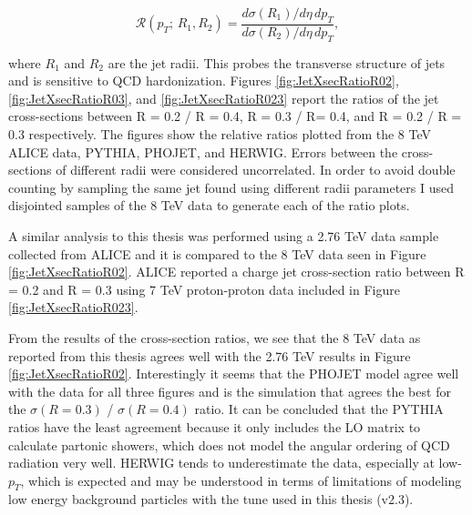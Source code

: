 \begin{equation}
\mathscr{R} (p_{T}; \, R_{1},R_{2}) = \frac{d\sigma(R_{1}) /d\eta \, dp_{T} }{d\sigma (R_{2}) /d\eta \, dp_{T}},
\label{eq:jetxsecratio}
\end{equation}

\noindent
where $R_{1}$ and $R_{2}$ are the jet radii. This probes the transverse structure of jets and is sensitive to QCD hardonization\cite{SOYEZ201159}.  Figures \ref{fig:JetXsecRatioR02}, \ref{fig:JetXsecRatioR03}, and \ref{fig:JetXsecRatioR023} report the ratios of the jet cross-sections between R = 0.2 / R = 0.4, R = 0.3 / R= 0.4, and R = 0.2 / R = 0.3 respectively.  The figures show the relative ratios plotted from the 8 TeV ALICE data, PYTHIA, PHOJET, and HERWIG.  Errors between the cross-sections of different radii were considered uncorrelated.  In order to avoid double counting by sampling the same jet found using different radii parameters I used disjointed samples of the 8 TeV data to generate each of the ratio plots.



A similar analysis to this thesis was performed using a 2.76 TeV  data sample collected from ALICE\cite{MA2013319} and it is compared to the 8 TeV data seen in Figure \ref{fig:JetXsecRatioR02}.  ALICE reported a charge jet cross-section ratio between R = 0.2 and R = 0.3 using 7 TeV proton-proton data\cite{Acharya:2018eat} included in Figure \ref{fig:JetXsecRatioR023}.

From the results of the cross-section ratios, we see that the 8 TeV data as reported from this thesis agrees well with the 2.76 TeV results in Figure \ref{fig:JetXsecRatioR02}.  Interestingly it seems that the PHOJET model agree well with the data for all three figures and is the simulation that agrees the best for the $\sigma (R = 0.3)$ / $\sigma (R = 0.4)$ ratio.  It can be concluded that the PYTHIA ratios have the least agreement because it only includes the LO matrix to calculate partonic showers, which does not model the angular ordering of QCD radiation very well.  HERWIG tends to underestimate the data, especially at low-$p_{T}$, which is expected and may be understood in terms of limitations of modeling low energy background particles with the tune used in this thesis (v2.3).  

